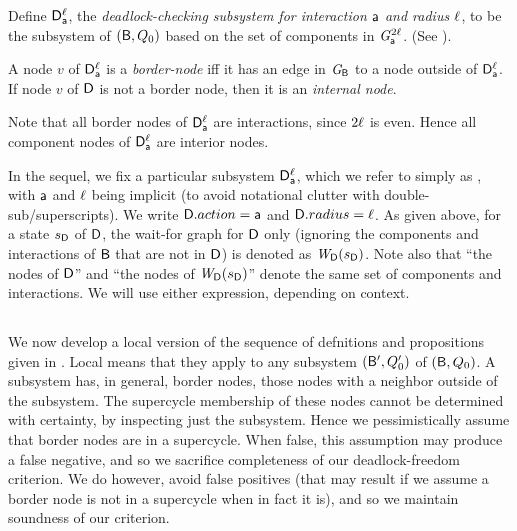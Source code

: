 \begin{definition} \label{def:dsk}
Define $\mathsf{D}_{\mathsf{a}}^{\ell}$, the \emph{deadlock-checking subsystem for interaction $\mathsf{a}$ and
radius $\ell$}, to be the subsystem of $(\mathsf{B}, Q_0)$ based on the set of %
components in $\mathit{G}_{\mathsf{a}}^{2\ell}$.  (See ).
\end{definition}

\begin{definition}  \label{def:dsk.border-and internal}
A node $v$ of $\mathsf{D}_{\mathsf{a}}^{\ell}$ is a \emph{border-node} iff it has an
edge in $\mathit{G}_{\mathsf{B}}$ to a node outside of $\mathsf{D}_{\mathsf{a}}^{\ell}$.
If node $v$ of $\mathsf{D}$ is not a border node, then it is an \emph{internal node}.
\end{definition}
Note that all border nodes of  $\mathsf{D}_{\mathsf{a}}^{\ell}$ are interactions,
since $2\ell$ is even. Hence all component nodes of $\mathsf{D}_{\mathsf{a}}^{\ell}$ are
interior nodes.



In the sequel, we fix a particular subsystem $\mathsf{D}_{\mathsf{a}}^{\ell}$, which
we refer to simply as \DS, with $\mathsf{a}$ and $\ell$ being implicit (to
avoid notational clutter with double-sub/superscripts). 
We write $\mathsf{D}.action = \mathsf{a}$ and $\mathsf{D}.radius = \ell$. 
%
As given above, for a state $s_\mathsf{D}$ of $\mathsf{D}$, the wait-for graph for $\mathsf{D}$ only (\ie ignoring the components and interactions of $\mathsf{B}$ that are not in
$\mathsf{D}$) is denoted as $\mathit{W}_{\mathsf{D}}({s_\mathsf{D}})$.
%
Note also that ``the nodes of $\mathsf{D}$'' and ``the nodes of $\mathit{W}_{\mathsf{D}}({s_\mathsf{D}})$'' denote the same set of components and interactions. 
We will use either expression, depending on context.


%
\subsection{}
\label{s:local.fixpoint}

We now develop a local version of the sequence of defnitions and propositions given in .  Local means that they apply to any
subsystem $(\mathsf{B}', Q'_0)$ of $(\mathsf{B}, Q_0)$. A subsystem has, in general, border nodes, \ie those nodes with a neighbor outside of the
subsystem. The supercycle membership of these nodes cannot be determined with certainty, by inspecting just the subsystem.
Hence we pessimistically assume that border nodes are in a supercycle. When false, this assumption may produce a false negative, and so we sacrifice
completeness of our deadlock-freedom criterion. We do however, avoid false positives (that may result if we assume a border node is not in a supercycle when in fact it
is), and so we maintain soundness of our criterion. 


